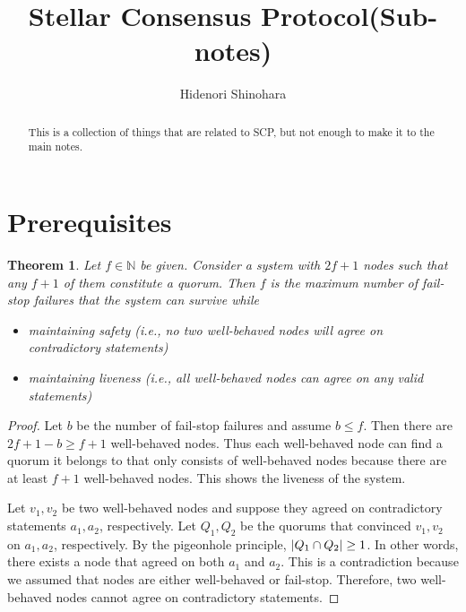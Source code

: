 \documentclass[12pt, psamsfonts]{amsart}
\newtheorem{thm}{Theorem}[section]
\theoremstyle{definition}
\theoremstyle{remark}
\numberwithin{equation}{section}
\begin{document}
\title{Stellar Consensus Protocol(Sub-notes)}
\author{Hidenori Shinohara}

\begin{abstract}
    This is a collection of things that are related to SCP, but not enough to make it to the main notes.
\end{abstract}

\maketitle

\tableofcontents

\section{Prerequisites}

\begin{thm}
    Let $f \in \mathbb{N}$ be given.
    Consider a system with $2f + 1$ nodes such that any $f + 1$ of them constitute a quorum.
    Then $f$ is the maximum number of fail-stop failures that the system can survive while
    \begin{itemize}
        \item
            maintaining safety (i.e., no two well-behaved nodes will agree on contradictory statements)
        \item
            maintaining liveness (i.e., all well-behaved nodes can agree on any valid statements)
    \end{itemize}
\end{thm}

\begin{proof}
    Let $b$ be the number of fail-stop failures and assume $b \leq f$.
    Then there are $2f + 1 - b \geq f + 1$ well-behaved nodes.
    Thus each well-behaved node can find a quorum it belongs to that only consists of well-behaved nodes because there are at least $f + 1$ well-behaved nodes.
    This shows the liveness of the system.

    Let $v_1, v_2$ be two well-behaved nodes and suppose they agreed on contradictory statements $a_1, a_2$, respectively.
    Let $Q_1, Q_2$ be the quorums that convinced $v_1, v_2$ on $a_1, a_2$, respectively.
    By the pigeonhole principle, $\abs{Q_1 \cap Q_2} \geq 1$.
    In other words, there exists a node that agreed on both $a_1$ and $a_2$.
    This is a contradiction because we assumed that nodes are either well-behaved or fail-stop.
    Therefore, two well-behaved nodes cannot agree on contradictory statements.
\end{proof}
\end{document}
